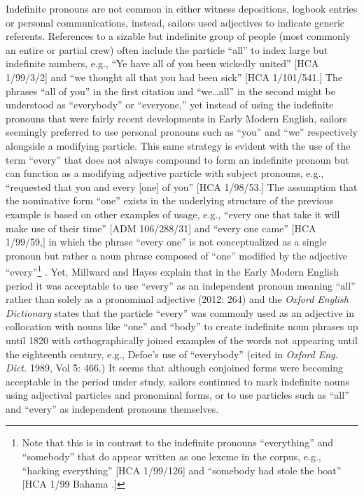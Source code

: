   Indefinite pronouns are not common in either witness depositions, logbook entries or personal communications, instead, sailors used adjectives to indicate generic referents. References to a sizable but indefinite group of people (most commonly an entire or partial crew) often include the particle “all” to index large but indefinite numbers, e.g., “Ye have all of you been wickedly united” [HCA 1/99/3/2] and “we thought all that you had been sick” [HCA 1/101/541.] The phrases “all of you” in the first citation and “we…all” in the second might be understood as “everybody” or “everyone,” yet instead of using the indefinite pronouns that were fairly recent developments in Early Modern English, sailors seemingly preferred to use personal pronouns such as “you” and “we” respectively alongside a modifying particle. This same strategy is evident with the use of the term “every” that does not always compound to form an indefinite pronoun but can function as a modifying adjective particle with subject pronouns, e.g., “requested that you and every [one] of you” [HCA 1/98/53.] The assumption that the nominative form “one” exists in the underlying structure of the previous example is based on other examples of usage, e.g., “every one that take it will make use of their time” [ADM 106/288/31] and “every one came” [HCA 1/99/59,] in which the phrase “every one” is not conceptualized as a single pronoun but rather a noun phrase composed of “one” modified by the adjective “every”\footnote{Note that this is in contrast to the indefinite pronouns “everything” and “somebody” that do appear written as one lexeme in the corpus, e.g., “hacking everything” [HCA 1/99/126] and “somebody had stole the boat” [HCA 1/99 Bahama \citealt{Islands1722}.]} . Yet, Millward and Hayes explain that in the Early Modern English period it was acceptable to use “every” as an independent pronoun meaning “all” rather than solely as a pronominal adjective (2012: 264) and the \textit{Oxford English Dictionary}  states that the particle “every” was commonly used as an adjective in collocation with nouns like “one” and “body” to create indefinite noun phrases up until 1820 with orthographically joined examples of the words not appearing until the eighteenth century, e.g.,  Defoe’s use of “everybody” (cited in \textit{Oxford Eng. Dict.} 1989, Vol 5: 466.) It seems that although conjoined forms were becoming acceptable in the period under study, sailors continued to mark indefinite nouns using adjectival particles and pronominal forms, or to use particles such as “all” and “every” as independent pronouns themselves.

